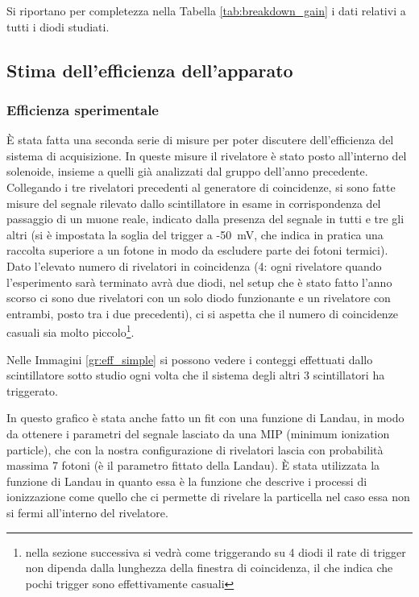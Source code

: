 Si riportano per completezza nella Tabella \ref{tab:breakdown_gain} i dati relativi a tutti i diodi studiati.


\subsection{Stima dell'efficienza dell'apparato}
\label{sec:efficiency}
\subsubsection{Efficienza sperimentale}
\`E stata fatta una seconda serie di misure per poter discutere dell'efficienza del sistema di acquisizione. In queste misure il rivelatore \`e stato posto all'interno del solenoide, insieme a quelli gi\`a analizzati dal gruppo dell'anno precedente. Collegando i tre rivelatori precedenti al generatore di coincidenze, si sono fatte misure del segnale rilevato dallo scintillatore in esame in corrispondenza del passaggio di un muone reale, indicato dalla presenza del segnale in tutti e tre gli altri (si è impostata la soglia del trigger a -50~mV, che indica in pratica una raccolta superiore a un fotone in modo da escludere parte dei fotoni termici). Dato l'elevato numero di rivelatori in coincidenza (4: ogni rivelatore quando l'esperimento sarà terminato avrà due diodi, nel setup che è stato fatto l'anno scorso ci sono due rivelatori con un solo diodo funzionante e un rivelatore con entrambi, posto tra i due precedenti), ci si aspetta che il numero di coincidenze casuali sia molto piccolo\footnote{nella sezione successiva si vedr\`a come triggerando su 4 diodi il rate di trigger non dipenda dalla lunghezza della finestra di coincidenza, il che indica che pochi trigger sono effettivamente casuali}.

Nelle Immagini \ref{gr:eff_simple} si possono vedere i conteggi effettuati dallo scintillatore sotto studio ogni volta che il sistema degli altri 3 scintillatori ha triggerato.


In questo grafico \`e stata anche fatto un fit con una funzione di Landau, in modo da ottenere i parametri del segnale lasciato da una MIP (minimum ionization particle), che con la nostra configurazione di rivelatori lascia con probabilit\`a massima 7 fotoni (è il parametro fittato della Landau). \`E stata utilizzata la funzione di Landau in quanto essa è la funzione che descrive i processi di ionizzazione come quello che ci permette di rivelare la particella nel caso essa non si fermi all'interno del rivelatore.

